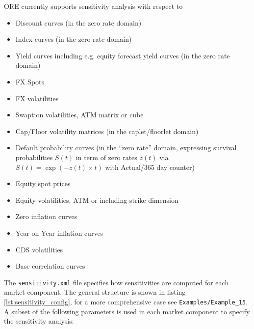 \documentclass[12pt, a4paper]{article}
\begin{document}
ORE currently supports sensitivity analysis with respect to
\begin{itemize}
\item Discount curves  (in the zero rate domain)
\item Index curves (in the zero rate domain)
\item Yield curves including e.g. equity forecast yield curves (in the zero rate domain)
\item FX Spots
\item FX volatilities
\item Swaption volatilities, ATM matrix or cube 
\item Cap/Floor volatility matrices (in the caplet/floorlet domain)
\item Default probability curves (in the ``zero rate'' domain, expressing survival probabilities $S(t)$ in term of zero rates $z(t)$ via $S(t)=\exp(-z(t)\times t)$ with Actual/365 day counter)
\item Equity spot prices
\item Equity volatilities, ATM or including strike dimension 
\item Zero inflation curves
\item Year-on-Year inflation curves
\item CDS volatilities
\item Base correlation curves
\end{itemize}

The {\tt sensitivity.xml} file specifies how sensitivities are computed for each market component. 
The general structure is shown in listing \ref{lst:sensitivity_config}, for a more comprehensive case see {\tt Examples/Example\_15}. A subset of the following parameters is used in each market component to specify the sensitivity analysis:
\end{document}
